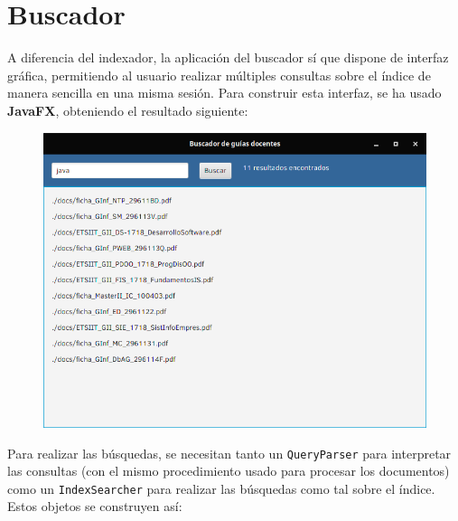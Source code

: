 \section{Buscador}

A diferencia del indexador, la aplicación del buscador sí que dispone de interfaz gráfica, permitiendo al usuario realizar múltiples consultas sobre el índice de manera sencilla en una misma sesión. Para construir esta interfaz, se ha usado \textbf{JavaFX}, obteniendo el resultado siguiente:

\begin{figure}[H]
    \centering
    \includegraphics[width=1\linewidth]{images/searcher-ui.png}
\end{figure}

Para realizar las búsquedas, se necesitan tanto un \verb|QueryParser| para interpretar las consultas (con el mismo procedimiento usado para procesar los documentos) como un \verb|IndexSearcher| para realizar las búsquedas como tal sobre el índice. Estos objetos se construyen así:

